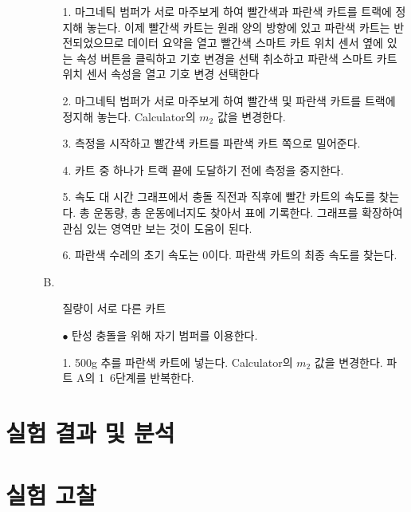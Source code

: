 \documentclass[12pt,a4paper]{article}
\begin{document}
\begin{enumerate}
\begin{enumerate}
\begin{enumerate}
                    \item [1.] 마그네틱 범퍼가 서로 마주보게 하여 빨간색과 파란색
                        카트를 트랙에 정지해 놓는다. 이제 빨간색 카트는 원래 양의
                        방향에 있고 파란색 카트는 반전되었으므로 데이터 요약을 열고
                        빨간색 스마트 카트 위치 센서 옆에 있는 속성 버튼을 클릭하고
                        기호 변경을 선택 취소하고 파란색 스마트 카트 위치 센서
                        속성을 열고 기호 변경 선택한다
                    \item [2.] 마그네틱 범퍼가 서로 마주보게 하여 빨간색 및 파란색
                        카트를 트랙에 정지해 놓는다. Calculator의 $m_2$ 값을
                        변경한다.
                    \item [3.] 측정을 시작하고 빨간색 카트를 파란색 카트 쪽으로
                        밀어준다.
                    \item [4.] 카트 중 하나가 트랙 끝에 도달하기 전에 측정을
                        중지한다.
                    \item [5.] 속도 대 시간 그래프에서 충돌 직전과 직후에 빨간
                        카트의 속도를 찾는다. 총 운동량, 총 운동에너지도 찾아서
                        표에 기록한다. 그래프를 확장하여 관심 있는 영역만 보는 것이
                        도움이 된다.
                    \item [6.] 파란색 수레의 초기 속도는 0이다. 파란색 카트의 최종
                        속도를 찾는다.
                \end{enumerate}
            \item [B.]
                \begin{enumerate}
                    \item [] 질량이 서로 다른 카트
                    \item [$\bullet$] 탄성 충돌을 위해 자기 범퍼를 이용한다.
                    \item [1.] 500g 추를 파란색 카트에 넣는다. Calculator의
                    $m_2$ 값을 변경한다. 파트 A의 1~6단계를 반복한다.
                \end{enumerate}
        \end{enumerate}
\end{enumerate}
\section{실험 결과 및 분석}
\section{실험 고찰}
\end{document}
